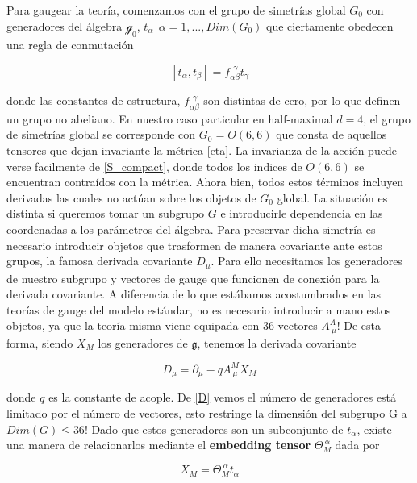 \documentclass{article}
\numberwithin{equation}{section}
\begin{document}
Para gaugear la teoría, comenzamos con el grupo de simetrías global $ G_0 $ con generadores del álgebra $ \mathcal{g}_0 $, $ t_{\alpha} \ \ \alpha=1,..., Dim(G_0)$ que ciertamente obedecen una regla de conmutación

\begin{equation}
\left[t_{\alpha}, t_{\beta}\right] = f_{\alpha \beta}^{\ \ \gamma} t_{\gamma}
\end{equation}

donde las constantes de estructura, $ f_{\alpha \beta}^{\ \ \gamma} $ son distintas de cero, por lo que definen un grupo no abeliano. En nuestro caso particular en half-maximal $ d=4 $, el grupo de simetrías global se corresponde con $ G_0=O(6,6) $ que consta de aquellos tensores que dejan invariante la métrica \ref{eta}. La invarianza de la acción puede verse facilmente de \ref{S_compact}, donde todos los indices de $ O(6,6) $ se encuentran contraídos con la métrica. Ahora bien, todos estos términos incluyen derivadas las cuales no actúan sobre los objetos de $ G_0 $ global. La situación es distinta si queremos tomar un subgrupo $ G $ e introducirle dependencia en las coordenadas a los parámetros del álgebra. Para preservar dicha simetría es necesario introducir objetos que trasformen de manera covariante ante estos grupos, la famosa derivada covariante $ D_{\mu} $. Para ello necesitamos los generadores de nuestro subgrupo y vectores de gauge que funcionen de conexión para la derivada covariante. A diferencia de lo que estábamos acostumbrados en las teorías de gauge del modelo estándar, no es necesario introducir a mano estos objetos, ya que la teoría misma viene equipada con 36 vectores $ A^A_{\ \mu} $! De esta forma, siendo $ X_M $ los generadores de $ \mathfrak{g} $, tenemos la derivada covariante

\begin{equation}\label{D}
D_{\mu} = \partial_{\mu} - q A^M_{\ \mu} X_M 
\end{equation}

donde $ q $ es la constante de acople. De \ref{D} vemos el número de generadores está limitado por el número de vectores, esto restringe la dimensión del subgrupo G a $ Dim(G) \leq 36 $! Dado que estos generadores son un subconjunto de $ t_{\alpha} $, existe una manera de relacionarlos mediante el \textbf{embedding tensor} $ \Theta_M^{\ \alpha} $ dada por

\begin{equation}
X_M = \Theta_M^{\ \alpha} t_{\alpha}
\end{equation}
\end{document}
